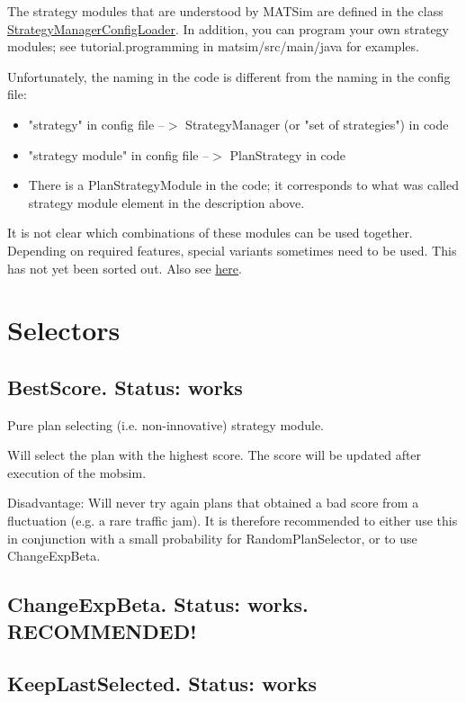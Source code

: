 \documentclass[a4paper,11pt]{report}
\begin{document}
The strategy modules that are understood by MATSim are defined in the class \href{http://www.matsim.org/xref/org/matsim/core/replanning/StrategyManagerConfigLoader.html}{StrategyManagerConfigLoader}. In addition, you can program your own strategy modules; see tutorial.programming in matsim/src/main/java for examples.

Unfortunately, the naming in the code is different from the naming in the config file:
\begin{itemize}
	\item "strategy" in config file --$>$ StrategyManager (or "set of strategies") in code
	\item "strategy module" in config file --$>$ PlanStrategy in code
	\item There is a PlanStrategyModule in the code; it corresponds to what was called strategy module element in the description above.
\end{itemize}

It is not clear which combinations of these modules can be used  together. Depending on required features, special variants sometimes  need to be used. This has not yet been sorted out. Also see \href{http://matsim.org/node/690}{here}.


\vfill\eject
\section{Selectors}

\subsection{BestScore.  Status: works}

Pure plan selecting (i.e. non-innovative) strategy module.

Will select the plan with the highest score. The score will be updated after execution of the mobsim.

Disadvantage: Will never try again plans that obtained a bad score  from a fluctuation (e.g. a rare traffic jam). It is therefore  recommended to either use this in conjunction with a small probability  for RandomPlanSelector, or to use ChangeExpBeta.

\subsection{ChangeExpBeta. Status: works. RECOMMENDED!}

\subsection{KeepLastSelected. Status: works}
\end{document}
